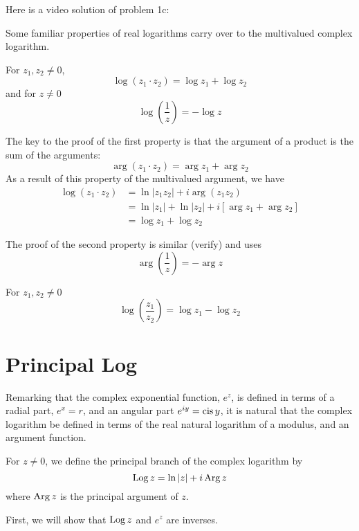 \documentclass[handout]{ximera}
\begin{document}
Here is a video solution of problem 1c:\\
\begin{foldable}
\end{foldable}

Some familiar properties of real logarithms carry over to the multivalued complex logarithm.

\begin{proposition}
For $z_1, z_2 \neq 0$, 
\[
\log(z_1\cdot z_2) = \log z_1 + \log z_2
\]
and for $z \neq 0$
\[
\log\left(\frac{1}{z}\right) = - \log z
\]
\end{proposition}
The key to the proof of the first property is that the argument of a product is the sum of the arguments:
\[
\arg(z_1 \cdot z_2) = \arg z_1 + \arg z_2
\]
As a result of this property of the multivalued argument, we have
\begin{align*}
\log(z_1\cdot z_2) &= \ln|z_1 z_2| + i\arg(z_1 z_2)\\
&= \ln|z_1| + \ln|z_2| + i\left[\arg z_1 + \arg z_2\right]\\
&= \log z_1 + \log z_2
\end{align*}

The proof of the second property is similar (verify) and uses
\[
\arg\left(\frac{1}{z}\right) = -\arg z
\]

\begin{corollary}
For $z_1, z_2 \neq 0$
\[
\log\left(\frac{z_1}{z_2}\right) = \log z_1 - \log z_2
\]
\end{corollary}

\section{Principal Log}

Remarking that the complex exponential function, $e^z$, is defined in terms of a radial part, $e^x=r$,
and an angular part $e^{iy}= \operatorname{cis} y$, it is natural that the complex logarithm be defined in terms of the real natural logarithm of a modulus,
and an argument function.

\begin{definition}[$\Log z$]
For $z \neq 0$, we define the principal branch of the complex logarithm by
\[
\operatorname{Log} z =  \ln|z| + i\operatorname{Arg} z
\]
where $\operatorname{Arg} z$ is the principal argument of $z$. 
\end{definition}

 

First, we will show that $\Log z$ and $e^z$ are inverses.
\end{document}
